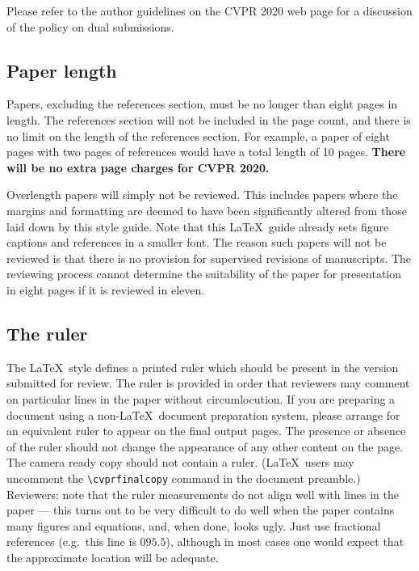 \documentclass[10pt,twocolumn,letterpaper]{article}
\begin{document}
\begin{CJK}{UTF8}{bkai}
   Please refer to the author guidelines on the CVPR 2020 web page for a
   discussion of the policy on dual submissions.~\cite{Alpher04}

   \subsection{Paper length}
   Papers, excluding the references section,
   must be no longer than eight pages in length. The references section
   will not be included in the page count, and there is no limit on the
   length of the references section. For example, a paper of eight pages
   with two pages of references would have a total length of 10 pages.
      {\bf There will be no extra page charges for CVPR 2020.}

   Overlength papers will simply not be reviewed.  This includes papers
   where the margins and formatting are deemed to have been significantly
   altered from those laid down by this style guide.  Note that this
   \LaTeX\ guide already sets figure captions and references in a smaller font.
   The reason such papers will not be reviewed is that there is no provision for
   supervised revisions of manuscripts.  The reviewing process cannot determine
   the suitability of the paper for presentation in eight pages if it is
   reviewed in eleven.

   \subsection{The ruler}
   The \LaTeX\ style defines a printed ruler which should be present in the
   version submitted for review.  The ruler is provided in order that
   reviewers may comment on particular lines in the paper without
   circumlocution.  If you are preparing a document using a non-\LaTeX\
   document preparation system, please arrange for an equivalent ruler to
   appear on the final output pages.  The presence or absence of the ruler
   should not change the appearance of any other content on the page.  The
   camera ready copy should not contain a ruler. (\LaTeX\ users may uncomment
   the \verb'\cvprfinalcopy' command in the document preamble.)  Reviewers:
   note that the ruler measurements do not align well with lines in the paper
   --- this turns out to be very difficult to do well when the paper contains
   many figures and equations, and, when done, looks ugly.  Just use fractional
   references (e.g.\ this line is $095.5$), although in most cases one would
   expect that the approximate location will be adequate.


\end{CJK}
\end{document}
